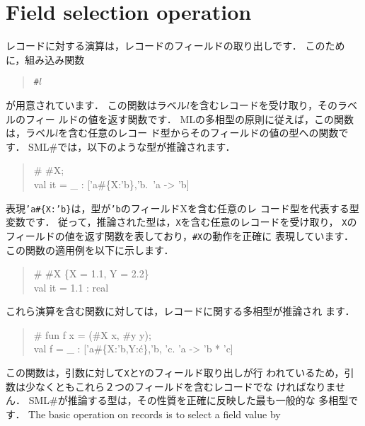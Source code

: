 \documentclass{jbook}
\newif\ifjp
\newcommand{\txt}[2]{#2}
\newcommand{\smlsharp}{SML\#}
\begin{document}
\section{\txt{フィールド取り出し演算}{Field selection operation}}
\label{sec:extensionFieldselection}

\ifjp%
	レコードに対する演算は，レコードのフィールドの取り出しです．
	このために，組み込み関数
\begin{tt}\begin{quote}
{\tt \#$l$}
\end{quote}\end{tt}
が用意されています．
	この関数はラベル$l$を含むレコードを受け取り，そのラベルのフィー
ルドの値を返す関数です．
	MLの多相型の原則に従えば，この関数は，ラベル$l$を含む任意のレコー
ド型からそのフィールドの値の型への関数です．
	\smlsharp{}では，以下のような型が推論されます．
\begin{tt}\begin{quote}
\# \#X;\\
val it = \_ : ['a\#\{X:'b\},'b.~'a -> 'b]
\end{quote}\end{tt}
	表現{\tt 'a\#\{X:'b\}}は，型が{\tt 'b}のフィールドXを含む任意のレ
コード型を代表する型変数です．
	従って，推論された型は，{\tt X}を含む任意のレコードを受け取り，
{\tt X}のフィールドの値を返す関数を表しており，{\tt \#X}の動作を正確に
表現しています．
	この関数の適用例を以下に示します．
\begin{tt}\begin{quote}
\# \#X \{X = 1.1, Y = 2.2\}\\
val it = 1.1 : real
\end{quote}\end{tt}
	これら演算を含む関数に対しては，レコードに関する多相型が推論され
ます．
\begin{tt}\begin{quote}
\# fun f x = (\#X x, \#y y);\\
val f = \_ : ['a\#\{X:'b,Y:\'c\},'b, 'c. 'a -> 'b * 'c]
\end{quote}\end{tt}
	この関数は，引数に対して{\tt X}と{\tt Y}のフィールド取り出しが行
われているため，引数は少なくともこれら２つのフィールドを含むレコードでな
ければなりません．
	\smlsharp{}が推論する型は，その性質を正確に反映した最も一般的な
多相型です．
\else%
	The basic operation on records is to select a field value by
\end{document}

